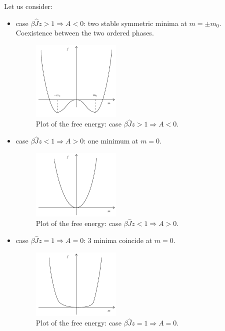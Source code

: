 \documentclass[../main/main.tex]{subfiles}
\begin{document}
Let us consider:
\begin{itemize}
\item case \( \beta \hat{J} z > 1 \Rightarrow A<0 \): two stable symmetric minima at \( m= \pm m_0 \). Coexistence between the two ordered phases.
\begin{figure}[h!]
\centering
\includegraphics[width=0.4\textwidth]{../lessons/11_image/2.pdf}
\caption{\label{fig:11_2} Plot of the free energy: case \( \beta \hat{J} z > 1 \Rightarrow A<0 \).}
\end{figure}
\item case \( \beta \hat{J} z < 1 \Rightarrow A>0 \): one minimum at \( m=0 \).
\begin{figure}[h!]
\centering
\includegraphics[width=0.4\textwidth]{../lessons/11_image/3.pdf}
\caption{\label{fig:11_3} Plot of the free energy: case \( \beta \hat{J} z < 1 \Rightarrow A>0 \).}
\end{figure}
\item case \( \beta \hat{J} z = 1 \Rightarrow A=0 \): 3 minima coincide at \( m=0 \).

\begin{figure}[h!]
\centering
\includegraphics[width=0.4\textwidth]{../lessons/11_image/4.pdf}
\caption{\label{fig:11_4} Plot of the free energy: case \( \beta \hat{J} z = 1 \Rightarrow A=0 \).}
\end{figure}
\end{itemize}
\end{document}

